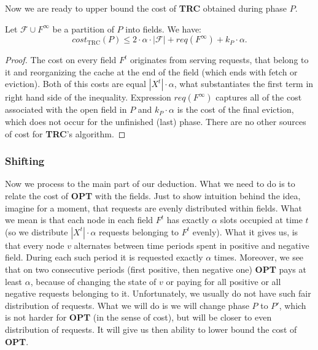 Now we are ready to upper bound the cost of \textbf{TRC} obtained during phase $P$.
\begin{lemma}
Let $\mathcal{F} \cup F^{\infty}$ be a partition of $P$ into fields. We have:
$$cost_{\mathrm{TRC}}(P) \leq 2 \cdot \alpha \cdot |\mathcal{F}| + 
req(F^{\infty}) + k_P \cdot 
\alpha.$$ 
\label{thm:trc_cost}
\end{lemma}
\begin{proof}
The cost on every field $F^t$ originates from serving requests, that belong 
to it and reorganizing the cache at the end of the field (which ends with fetch or 
eviction). Both of this costs are equal 
$|X^t| \cdot \alpha$, what substantiates the first term in right hand side of the 
inequality. Expression $req(F^{\infty})$ captures all of the cost associated 
with the open field in $P$ and $k_P \cdot \alpha$ is the cost of the final eviction, 
which does not occur for the unfinished (last) phase. There are no other sources of
cost for \textbf{TRC}'s algorithm.
\end{proof}

\subsubsection{Shifting}
Now we process to the main part of our deduction. What we need to do is to 
relate the cost of \textbf{OPT} with the fields. Just to show intuition behind the 
idea, imagine 
for a moment, that requests are evenly distributed within fields. What we mean
is that each node in each field $F^t$ has exactly $\alpha$ slots 
occupied at time $t$ (so we distribute $|X^t| \cdot \alpha$ requests belonging 
to $F^t$ evenly). What it gives us, is that every node $v$ alternates between 
time periods spent in positive and negative field. During each such period it is 
requested exactly $\alpha$ times. Moreover, we see that on two consecutive 
periods (first positive, then negative one) \textbf{OPT} pays at least $\alpha$, 
because of changing 
the state of $v$ or paying for all positive or all negative requests belonging to it. 
Unfortunately, we usually do not have such fair distribution of requests. What we 
will do is 
we will change phase $P$ to $P'$, which is not harder for \textbf{OPT} (in the sense
of cost), but will be closer to even distribution of requests. It will give us then 
ability to lower bound the cost of \textbf{OPT}.

